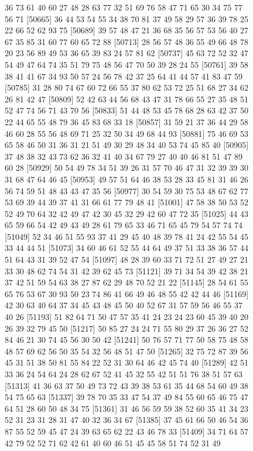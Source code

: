 \documentclass{article}
\begin{document}
\begin{figure}[H]
\begin{Schunk}
\begin{Soutput}
[50641] 36 73 61 40 60 27 48 28 63 77 32 51 69 76 58 47 71 65 30 34 75 77 56 71
[50665] 36 44 53 54 55 34 38 70 81 37 49 58 29 57 36 39 78 25 22 66 52 62 93 75
[50689] 39 57 48 47 21 36 68 35 56 57 53 56 40 27 67 35 85 31 60 77 60 65 72 88
[50713] 28 56 57 48 36 55 49 66 48 78 20 23 56 89 49 53 36 65 39 83 24 57 81 62
[50737] 45 63 72 52 32 47 54 49 47 64 74 35 51 79 75 48 56 47 70 50 39 28 24 55
[50761] 39 58 38 41 41 67 34 93 50 57 24 56 78 42 37 25 64 41 44 57 41 83 47 59
[50785] 31 28 80 74 67 60 72 66 55 37 80 62 53 72 25 51 68 27 34 62 26 81 42 47
[50809] 52 42 63 44 56 68 43 47 31 78 66 55 27 35 48 51 52 47 74 56 71 43 70 56
[50833] 51 44 48 53 45 78 68 28 63 42 37 50 22 44 65 55 48 79 36 45 83 68 33 18
[50857] 31 59 21 37 36 44 29 58 46 60 28 55 56 48 69 71 25 32 50 34 49 68 44 93
[50881] 75 46 69 53 65 58 46 50 31 36 31 21 51 49 30 29 48 34 40 53 74 45 85 40
[50905] 37 48 38 32 43 73 62 36 32 41 40 34 67 79 27 40 40 46 81 51 47 89 60 28
[50929] 50 54 49 78 34 51 39 26 31 57 70 46 47 31 32 39 39 30 31 68 47 64 46 45
[50953] 49 57 51 64 46 38 53 28 33 45 81 31 46 26 56 74 59 51 48 43 43 47 35 56
[50977] 30 54 59 30 75 53 48 67 62 77 53 69 39 44 39 37 41 31 66 61 77 79 48 41
[51001] 47 58 38 50 53 52 52 49 70 64 32 42 49 47 42 30 45 32 29 42 60 47 72 35
[51025] 44 43 65 59 66 54 42 49 43 49 28 61 79 65 33 46 71 65 45 79 54 57 74 74
[51049] 52 34 46 51 55 93 37 41 29 45 40 48 39 78 41 24 42 55 54 45 33 44 44 51
[51073] 34 60 46 61 52 55 44 64 49 37 51 33 38 36 57 44 51 64 43 31 39 52 47 54
[51097] 48 28 39 60 33 71 72 51 27 49 27 21 33 30 48 62 74 54 31 42 39 62 45 73
[51121] 39 71 34 54 39 42 38 21 37 42 51 59 54 63 38 27 87 62 29 48 70 52 21 22
[51145] 28 54 61 55 65 76 53 67 30 93 50 23 74 86 41 66 49 46 48 55 42 42 44 46
[51169] 42 30 63 40 64 37 34 45 43 48 45 50 40 52 67 31 57 59 56 46 55 37 40 26
[51193] 51 82 64 71 50 47 57 35 41 24 23 24 23 60 45 39 40 20 26 39 32 79 45 50
[51217] 50 85 27 24 24 71 55 80 29 37 26 36 27 52 84 46 21 30 74 45 56 30 50 42
[51241] 50 76 57 71 77 50 58 75 48 58 48 57 69 62 56 50 35 54 32 56 48 51 47 50
[51265] 32 75 72 87 39 56 45 31 51 38 50 81 55 84 22 52 31 30 64 46 42 45 74 40
[51289] 42 51 33 36 24 54 64 24 28 62 67 52 41 45 32 55 42 51 51 76 38 51 57 63
[51313] 41 36 63 37 50 49 73 72 43 39 38 53 61 35 44 68 54 60 49 38 54 75 65 63
[51337] 39 78 70 35 33 47 54 37 49 84 55 60 65 46 75 47 64 51 28 60 50 48 34 75
[51361] 31 46 56 59 59 38 52 60 35 41 34 23 52 31 23 31 28 31 47 40 32 36 34 67
[51385] 37 45 61 66 50 46 54 36 87 55 52 59 45 47 24 39 63 65 62 22 43 46 78 33
[51409] 34 71 64 57 42 79 52 52 71 62 42 61 40 60 46 51 45 45 58 51 74 52 31 49

\end{Soutput}
\end{Schunk}
\end{figure}
\end{document}
